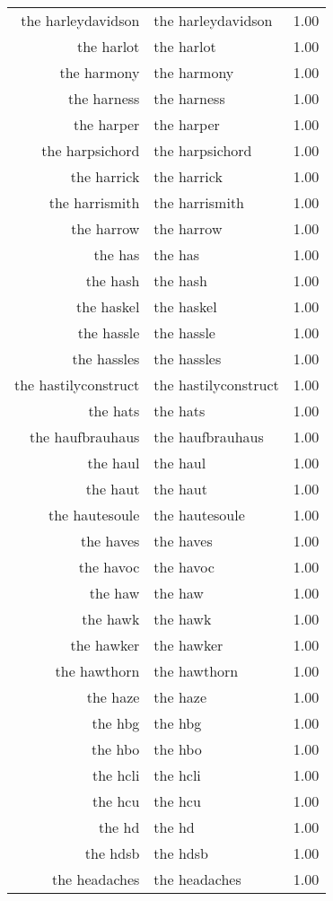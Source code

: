 \begin{table}[ht]
\begin{tabular}{rlr}
  the harleydavidson & the harleydavidson & 1.00 \\ 
  the harlot & the harlot & 1.00 \\ 
  the harmony & the harmony & 1.00 \\ 
  the harness & the harness & 1.00 \\ 
  the harper & the harper & 1.00 \\ 
  the harpsichord & the harpsichord & 1.00 \\ 
  the harrick & the harrick & 1.00 \\ 
  the harrismith & the harrismith & 1.00 \\ 
  the harrow & the harrow & 1.00 \\ 
  the has & the has & 1.00 \\ 
  the hash & the hash & 1.00 \\ 
  the haskel & the haskel & 1.00 \\ 
  the hassle & the hassle & 1.00 \\ 
  the hassles & the hassles & 1.00 \\ 
  the hastilyconstruct & the hastilyconstruct & 1.00 \\ 
  the hats & the hats & 1.00 \\ 
  the haufbrauhaus & the haufbrauhaus & 1.00 \\ 
  the haul & the haul & 1.00 \\ 
  the haut & the haut & 1.00 \\ 
  the hautesoule & the hautesoule & 1.00 \\ 
  the haves & the haves & 1.00 \\ 
  the havoc & the havoc & 1.00 \\ 
  the haw & the haw & 1.00 \\ 
  the hawk & the hawk & 1.00 \\ 
  the hawker & the hawker & 1.00 \\ 
  the hawthorn & the hawthorn & 1.00 \\ 
  the haze & the haze & 1.00 \\ 
  the hbg & the hbg & 1.00 \\ 
  the hbo & the hbo & 1.00 \\ 
  the hcli & the hcli & 1.00 \\ 
  the hcu & the hcu & 1.00 \\ 
  the hd & the hd & 1.00 \\ 
  the hdsb & the hdsb & 1.00 \\ 
  the headaches & the headaches & 1.00 \\ 

\end{tabular}
\end{table}
